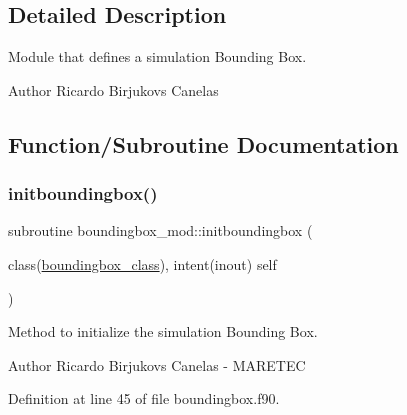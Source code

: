 \subsection{Detailed Description}
Module that defines a simulation Bounding Box. 

\begin{DoxyAuthor}{Author}
Ricardo Birjukovs Canelas 
\end{DoxyAuthor}


\subsection{Function/\+Subroutine Documentation}
\mbox{\label{namespaceboundingbox__mod_a35e41bb92c19802441dd8d748c3acfb4}} 
\subsubsection{\texorpdfstring{initboundingbox()}{initboundingbox()}}
{\footnotesize\ttfamily subroutine boundingbox\+\_\+mod\+::initboundingbox (\begin{DoxyParamCaption}\item[{class(\mbox{\hyperlink{structboundingbox__mod_1_1boundingbox__class}{boundingbox\+\_\+class}}), intent(inout)}]{self }\end{DoxyParamCaption})\hspace{0.3cm}{\ttfamily [private]}}



Method to initialize the simulation Bounding Box. 

\begin{DoxyAuthor}{Author}
Ricardo Birjukovs Canelas -\/ M\+A\+R\+E\+T\+EC 
\end{DoxyAuthor}


Definition at line 45 of file boundingbox.\+f90.


\mbox{\label{namespaceboundingbox__mod_a6ec461b758bc180dc72b5fb23169feca}} 
